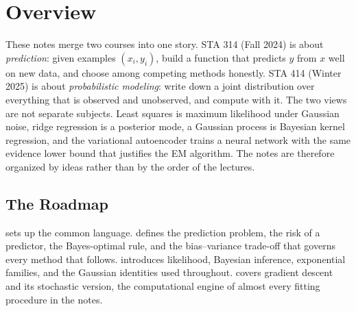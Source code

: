 \chapter*{Overview}

These notes merge two courses into one story. STA 314 (Fall 2024) is about \emph{prediction}: given examples $(x_i,y_i)$, build a function that predicts $y$ from $x$ well on new data, and choose among competing methods honestly. STA 414 (Winter 2025) is about \emph{probabilistic modeling}: write down a joint distribution over everything that is observed and unobserved, and compute with it. The two views are not separate subjects. Least squares is maximum likelihood under Gaussian noise, ridge regression is a posterior mode, a Gaussian process is Bayesian kernel regression, and the variational autoencoder trains a neural network with the same evidence lower bound that justifies the EM algorithm. The notes are therefore organized by ideas rather than by the order of the lectures.

\section*{The Roadmap}

 sets up the common language.  defines the prediction problem, the risk of a predictor, the Bayes-optimal rule, and the bias--variance trade-off that governs every method that follows.  introduces likelihood, Bayesian inference, exponential families, and the Gaussian identities used throughout.  covers gradient descent and its stochastic version, the computational engine of almost every fitting procedure in the notes.

